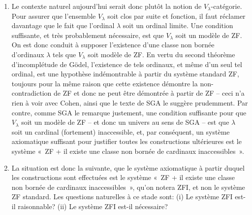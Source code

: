 \documentclass[10pt]{fichiers-configuration-latex/smfart}
\begin{document}
\begin{enumerate}
\item Le contexte naturel aujourd'hui serait donc plutôt la
notion de $V_\lambda$-catégorie. Pour assurer que l'ensemble
$V_\lambda$ soit clos par suite et fonction, il faut
réclamer davantage que le fait que l'ordinal $\lambda$ soit
un ordinal limite. Une condition suffisante, et très
probablement nécessaire, est que $V_\lambda$ soit un modèle
de ZF. On est donc conduit à supposer l'existence d'une
classe non bornée d'ordinaux $\lambda$ tels que $V_\lambda$
soit modèle de ZF. En vertu du second théorème
d'incomplétude de Gödel, l'existence de tels ordinaux, et
même d'un seul tel ordinal, est une hypothèse indémontrable
à partir du système standard ZF, toujours pour la même
raison que cette existence démontre la non-contradiction de
ZF et donc ne peut être démontrée à partir de ZF -- ceci n'a
rien à voir avec Cohen, ainsi que le texte de SGA le suggère
prudemment.
Par contre, comme SGA le remarque justement, une condition
suffisante pour que $V_\lambda$ soit un modèle de ZF -- et
donc un univers au sens de SGA -- est que $\lambda$ soit un
cardinal (fortement) inaccessible, et, par conséquent, un
système axiomatique suffisant pour justifier toutes les
constructions ultérieures est le système « ZF + il existe une
classe non bornée de cardinaux inaccessibles ».

\item La situation est donc la suivante, que le système
axiomatique à partir duquel les constructions sont
effectuées est le système « ZF + il existe une classe non
bornée de cardinaux inaccessibles », qu'on notera ZFI, et non
le système ZF standard. Les questions naturelles à ce stade
sont: (i) Le système ZFI est-il raisonnable? (ii) Le système
ZFI est-il nécessaire? 


\end{enumerate}
\end{document}
